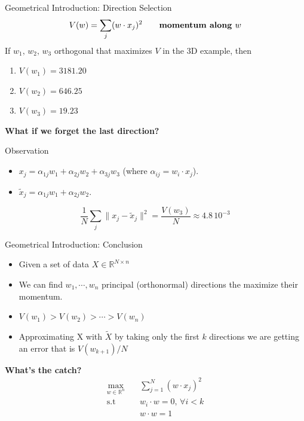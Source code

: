 \documentclass[10pt]{beamer}
\theoremstyle{definition}
\newcommand{\R}{\mathbb{R}}
\newcommand{\1}{\mathbbm{1}}
\begin{document}
\begin{frame}{Geometrical Introduction: Direction Selection}
  \[
    V(w)=\sum_j (w \cdot x_j)^2 \qquad\mbox{\bf momentum along $w$}
  \]
  If $w_1,\,w_2,\,w_3$ orthogonal that maximizes $V$ in the 3D example, then
  \begin{enumerate}
    \item $V(w_1) =  3181.20$\hfill{}
    \item $V(w_2) = 646.25$\hfill{}
    \item $V(w_3) = 19.23$ \hfill{}
  \end{enumerate}
    \begin{center}
      {\bf What if we forget the last direction?}
    \end{center}
  \begin{block}{Observation}
    \begin{itemize}
        \item $x_j =\alpha_{1j}w_1+\alpha_{2j}w_2+\alpha_{3j}w_3$
          (where $\alpha_{ij} = w_i\cdot x_j$).
        \item $\tilde x_j = \alpha_{1j}w_1 + \alpha_{2j}w_2$. 
    \end{itemize}
    \begin{equation}
      \frac{1}{N}\sum_j \|x_j - \tilde x_j\|^2 = \frac{V(w_3)}{N}\approx
      4.8\,10^{-3}
      \tag{MSE}
    \end{equation}
  \end{block}
\end{frame}
\begin{frame}{Geometrical Introduction: Conclusion}
  \begin{itemize}
    \item Given a set of data $X\in\R^{N\times n}$
    \item We can find $w_1,\cdots,w_n$ principal (orthonormal) directions the
      maximize their momentum.
    \item $V(w_1) > V(w_2)>\cdots> V(w_n)$
    \item Approximating X with $\tilde X$ by taking only the first $k$ directions we are
    getting an error that is $V(w_{k+1})/N$
  \end{itemize}
  {\bf\centering What's the catch?}
   \begin{equation}
     \begin{aligned}
       \max_{w\in\R^n}\quad & \sum_{j=1}^N (w \cdot x_j)^2\\
       \mbox{s.t}\quad & w_i \cdot w =0, \,\forall i<k \\
       & w\cdot w = 1\\
    \end{aligned}
    \label{MP}
    \tag{MP}
  \end{equation} 
\end{frame}
\end{document}

